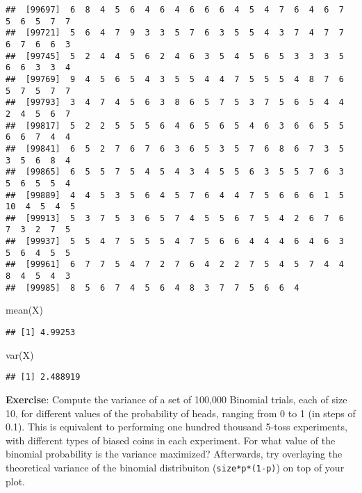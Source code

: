\documentclass[
]{book}
\newenvironment{Shaded}{\begin{snugshade}}{\end{snugshade}}
\newcommand{\FunctionTok}[1]{\textcolor[rgb]{0.00,0.00,0.00}{#1}}
\newcommand{\NormalTok}[1]{#1}
\begin{document}
\begin{verbatim}
##  [99697]  6  8  4  5  6  4  6  4  6  6  6  4  5  4  7  6  4  6  7  5  6  5  7  7
##  [99721]  5  6  4  7  9  3  3  5  7  6  3  5  5  4  3  7  4  7  7  6  7  6  6  3
##  [99745]  5  2  4  4  5  6  2  4  6  3  5  4  5  6  5  3  3  3  5  6  6  3  3  4
##  [99769]  9  4  5  6  5  4  3  5  5  4  4  7  5  5  5  4  8  7  6  5  7  5  7  7
##  [99793]  3  4  7  4  5  6  3  8  6  5  7  5  3  7  5  6  5  4  4  2  4  5  6  7
##  [99817]  5  2  2  5  5  5  6  4  6  5  6  5  4  6  3  6  6  5  5  6  6  7  4  4
##  [99841]  6  5  2  7  6  7  6  3  6  5  3  5  7  6  8  6  7  3  5  3  5  6  8  4
##  [99865]  6  5  5  7  5  4  5  4  3  4  5  5  6  3  5  5  7  6  3  5  6  5  5  4
##  [99889]  4  4  5  3  5  6  4  5  7  6  4  4  7  5  6  6  6  1  5 10  4  5  4  5
##  [99913]  5  3  7  5  3  6  5  7  4  5  5  6  7  5  4  2  6  7  6  7  3  2  7  5
##  [99937]  5  5  4  7  5  5  5  4  7  5  6  6  4  4  4  6  4  6  3  5  6  4  5  5
##  [99961]  6  7  7  5  4  7  2  7  6  4  2  2  7  5  4  5  7  4  4  8  4  5  4  3
##  [99985]  8  5  6  7  4  5  6  4  8  3  7  7  5  6  6  4
\end{verbatim}

\begin{Shaded}
\begin{Highlighting}[]
\FunctionTok{mean}\NormalTok{(X)}
\end{Highlighting}
\end{Shaded}

\begin{verbatim}
## [1] 4.99253
\end{verbatim}

\begin{Shaded}
\begin{Highlighting}[]
\FunctionTok{var}\NormalTok{(X)}
\end{Highlighting}
\end{Shaded}

\begin{verbatim}
## [1] 2.488919
\end{verbatim}

\textbf{Exercise}: Compute the variance of a set of 100,000 Binomial trials, each of size 10, for different values of the probability of heads, ranging from 0 to 1 (in steps of 0.1). This is equivalent to performing one hundred thousand 5-toss experiments, with different types of biased coins in each experiment. For what value of the binomial probability is the variance maximized? Afterwards, try overlaying the theoretical variance of the binomial distribuiton (\texttt{size*p*(1-p)}) on top of your plot.
\end{document}
